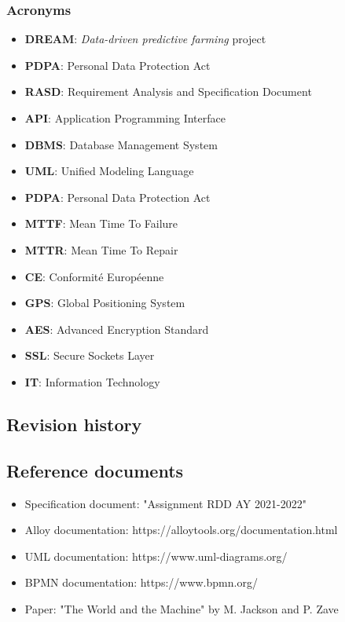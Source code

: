 \documentclass[table, 12pt]{article}
\begin{document}
\subsubsection*{Acronyms}
\begin{itemize}
    \item \textbf{DREAM}: \emph{Data-driven predictive farming} project
    \item \textbf{PDPA}: Personal Data Protection Act 
    \item \textbf{RASD}: Requirement Analysis and Specification Document
    \item \textbf{API}: Application Programming Interface
    \item \textbf{DBMS}: Database Management System
    \item \textbf{UML}: Unified Modeling Language
    \item \textbf{PDPA}: Personal Data Protection Act
    \item \textbf{MTTF}: Mean Time To Failure
    \item \textbf{MTTR}: Mean Time To Repair
    \item \textbf{CE}: Conformité Européenne
    \item \textbf{GPS}: Global Positioning System
    \item \textbf{AES}: Advanced Encryption Standard
    \item \textbf{SSL}: Secure Sockets Layer
    \item \textbf{IT}: Information Technology
\end{itemize}
\subsection{Revision history}
\subsection{Reference documents}
\begin{itemize}
    \item Specification document: "Assignment RDD AY 2021-2022"
    \item Alloy documentation: https://alloytools.org/documentation.html
    \item UML documentation: https://www.uml-diagrams.org/
    \item BPMN documentation: https://www.bpmn.org/
    \item Paper: "The World and the Machine" by M. Jackson and P. Zave
\end{itemize}
\end{document}
